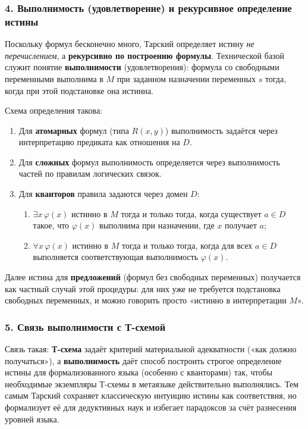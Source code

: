 \documentclass[a4paper,12pt]{article}
\begin{document}
\subsubsection*{4. Выполнимость (удовлетворение) и рекурсивное определение истины}

Поскольку формул бесконечно много, Тарский определяет истину \emph{не перечислением}, а \textbf{рекурсивно по построению формулы}. Технической базой служит понятие \textbf{выполнимости} (удовлетворения): формула со свободными переменными выполнима в $M$ при заданном назначении переменных $s$ тогда, когда при этой подстановке она истинна.

Схема определения такова:
\begin{enumerate}
    \item Для \textbf{атомарных} формул (типа $R(x,y)$) выполнимость задаётся через интерпретацию предиката как отношения на $D$.
    \item Для \textbf{сложных} формул выполнимость определяется через выполнимость частей по правилам логических связок.
    \item Для \textbf{кванторов} правила задаются через домен $D$:
    \begin{enumerate}
        \item $\exists x\,\varphi(x)$ истинно в $M$ тогда и только тогда, когда существует $a \in D$ такое, что $\varphi(x)$ выполнима при назначении, где $x$ получает $a$;
        \item $\forall x\,\varphi(x)$ истинно в $M$ тогда и только тогда, когда для всех $a \in D$ выполняется соответствующая выполнимость $\varphi(x)$.
    \end{enumerate}
\end{enumerate}

Далее истина для \textbf{предложений} (формул без свободных переменных) получается как частный случай этой процедуры: для них уже не требуется подстановка свободных переменных, и можно говорить просто «истинно в интерпретации $M$».

\subsubsection*{5. Связь выполнимости с Т-схемой}

Связь такая: \textbf{Т-схема} задаёт критерий материальной адекватности («как должно получаться»), а \textbf{выполнимость} даёт способ построить строгое определение истины для формализованного языка (особенно с кванторами) так, чтобы необходимые экземпляры Т-схемы в метаязыке действительно выполнялись. Тем самым Тарский сохраняет классическую интуицию истины как соответствия, но формализует её для дедуктивных наук и избегает парадоксов за счёт разнесения уровней языка.
\end{document}
